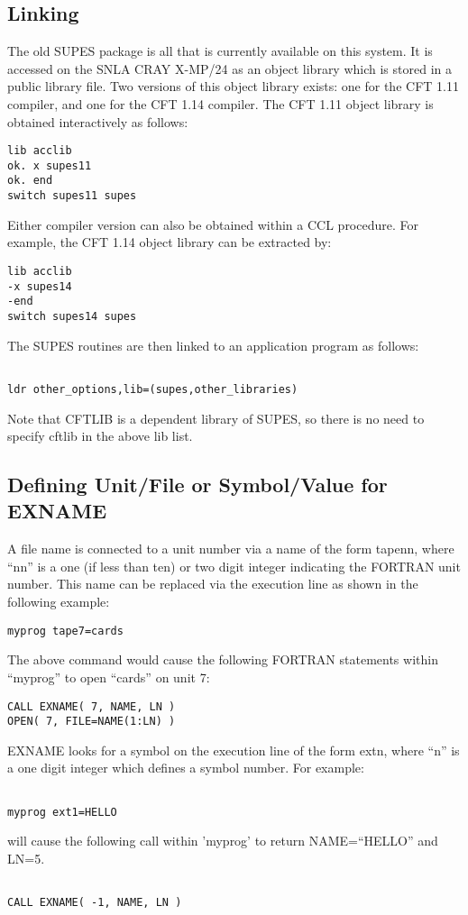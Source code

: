 \subsection{Linking}
The old SUPES package is all that is currently available on this system.
It is accessed on the SNLA CRAY X-MP/24 as an object library
which is stored in a public library file.  Two versions of this object
library exists: one for the CFT 1.11 compiler, and one for the CFT 1.14
compiler.  The CFT 1.11 object library is obtained interactively as follows:
\begin{verbatim}
lib acclib
ok. x supes11
ok. end
switch supes11 supes
\end{verbatim}

Either compiler version can also be obtained within a CCL procedure.  For
example, the CFT 1.14 object library can be extracted by:
\begin{verbatim}
lib acclib
-x supes14
-end
switch supes14 supes
\end{verbatim}

The SUPES routines are then linked to an application program as follows:
\begin{verbatim}

ldr other_options,lib=(supes,other_libraries)

\end{verbatim}
Note that CFTLIB is a dependent library of SUPES, so there is no need to
specify cftlib in the above lib list.


\subsection{Defining Unit/File or Symbol/Value for EXNAME}
A file name is connected to a unit number via a name of the form tapenn,
where ``nn'' is a one (if less than ten) or two digit integer indicating the
FORTRAN unit number. This name can be replaced via the execution line as
shown in the following example:

\verb+myprog tape7=cards+

The above command would cause the following FORTRAN statements within
``myprog'' to open ``cards'' on unit 7:
\begin{verbatim}
CALL EXNAME( 7, NAME, LN )
OPEN( 7, FILE=NAME(1:LN) )
\end{verbatim}

EXNAME looks for a symbol on the execution line of the form extn, where
``n'' is a one digit integer which defines a symbol number.  For example:
\begin{verbatim}

myprog ext1=HELLO

\end{verbatim}
will cause the following call within 'myprog' to return NAME=``HELLO'' and
LN=5.
\begin{verbatim}

CALL EXNAME( -1, NAME, LN )
\end{verbatim}


